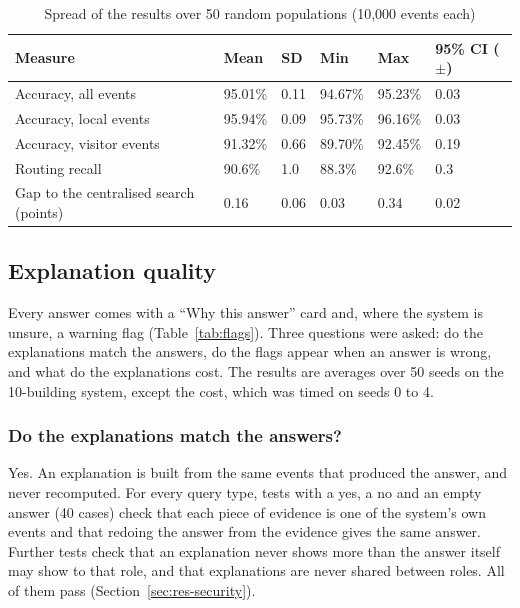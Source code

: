 \documentclass[12pt,a4paper,oneside]{report}
\begin{document}
\begin{table}[htbp]
\centering
\caption{Spread of the results over 50 random populations (10,000 events each)}\label{tab:seeds}
{\small\setlength{\tabcolsep}{4pt}\renewcommand{\arraystretch}{1.2}
\begin{tabular}{|p{3.6cm}|p{1.9cm}|p{1.9cm}|p{1.9cm}|p{1.9cm}|p{2.4cm}|}\hline
\textbf{Measure} & \textbf{Mean} & \textbf{SD} & \textbf{Min} & \textbf{Max} & \textbf{95\% CI ($\pm$)}\\\hline
Accuracy, all events & 95.01\% & 0.11 & 94.67\% & 95.23\% & 0.03\\\hline
Accuracy, local events & 95.94\% & 0.09 & 95.73\% & 96.16\% & 0.03\\\hline
Accuracy, visitor events & 91.32\% & 0.66 & 89.70\% & 92.45\% & 0.19\\\hline
Routing recall & 90.6\% & 1.0 & 88.3\% & 92.6\% & 0.3\\\hline
Gap to the centralised search (points) & 0.16 & 0.06 & 0.03 & 0.34 & 0.02\\\hline
\end{tabular}}
\end{table}

\subsection{Explanation quality}\label{sec:res-expl}
Every answer comes with a ``Why this answer'' card and, where the system is unsure, a warning flag (Table~\ref{tab:flags}). Three questions were asked: do the explanations match the answers, do the flags appear when an answer is wrong, and what do the explanations cost. The results are averages over 50 seeds on the 10-building system, except the cost, which was timed on seeds 0 to 4.

\subsubsection{Do the explanations match the answers?}
Yes. An explanation is built from the same events that produced the answer, and never recomputed. For every query type, tests with a yes, a no and an empty answer (40 cases) check that each piece of evidence is one of the system's own events and that redoing the answer from the evidence gives the same answer. Further tests check that an explanation never shows more than the answer itself may show to that role, and that explanations are never shared between roles. All of them pass (Section~\ref{sec:res-security}).
\end{document}
